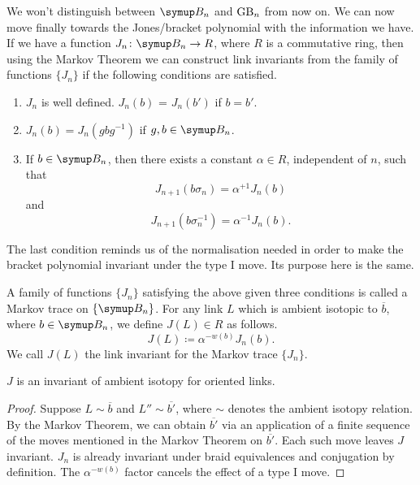 We won't distinguish between \(\B_n\) and \(\text{GB}_n\) from now on. We can now move finally towards the Jones/bracket polynomial with the information we have. If we have a function \(J_n \colon \B_n \rightarrow R\), where \(R\) is a commutative ring, then using the Markov Theorem we can construct link invariants from the family of functions \(\{J_n\}\) if the following conditions are satisfied.
\begin{enumerate}
    \item \(J_n\) is well defined. \(J_n(b)\) = \(J_n(b')\) if \(b = b'\).
	\item \(J_n(b) = J_n(gbg^{-1})\) if \(g, b \in \B_n\).
	\item If \(b \in \B_n\), then there exists a constant \(\alpha\in R\), independent of \(n\), such that \[J_{n+1} (b\sigma_n) = \alpha^{+1} J_n(b)\] and \[J_{n+1} (b\sigma_{n}^{-1}) = \alpha^{-1} J_n(b).\]
\end{enumerate}
\noindent The last condition reminds us of the normalisation needed in order to make the bracket polynomial invariant under the type I move. Its purpose here is the same.

A family of functions \(\{J_n\}\) satisfying the above given three conditions is called a Markov trace on \(\{\B_n\}\). For any link \(L\) which is ambient isotopic to \(\overline{b}\), where \(b \in \B_n\), we define \(J(L) \in R\) as follows. \[J(L) \coloneq \alpha^{-w(b)}J_n(b).\] We call \(J(L)\) the link invariant for the Markov trace \(\{J_n\}\).

\begin{thm}
    \(J\) is an invariant of ambient isotopy for oriented links.
\end{thm}
\begin{proof}
	Suppose \(L \sim \overline{b}\) and \(L'' \sim \overline{b'}\), where \(\sim\) denotes the ambient isotopy relation. By the Markov Theorem, we can obtain \(\overline{b'}\) via an application of a finite sequence of the moves mentioned in the Markov Theorem  on \(\overline{b'}\). Each such move leaves \(J\) invariant. \(J_n\) is already invariant under braid equivalences and conjugation by definition. The \(\alpha^{-w(b)}\) factor cancels the effect of a type I move.
\end{proof}

